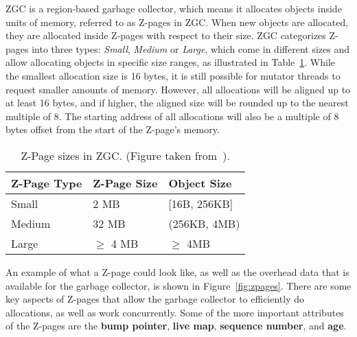 ZGC is a region-based garbage collector, which means it allocates objects inside units of memory, referred to as Z-pages in ZGC. When new objects are allocated, they are allocated inside Z-pages with respect to their size. ZGC categorizes Z-pages into three types: \textit{Small}, \textit{Medium} or \textit{Large}, which come in different sizes and allow allocating objects in specific size ranges, as illustrated in Table~\ref{table:zpage_sizes}. While the smallest allocation size is 16 bytes, it is still possible for mutator threads to request smaller amounts of memory. However, all allocations will be aligned up to at least 16 bytes, and if higher, the aligned size will be rounded up to the nearest multiple of 8. The starting address of all allocations will also be a multiple of 8 bytes offset from the start of the Z-page's memory.

\begin{table}[H]
    \centering
    \begin{tabular}{lllll}
        \hline
        Z-Page Type & Z-Page Size   & \multicolumn{3}{l}{Object Size}      \\ \hline
        Small       & 2 MB          & \multicolumn{3}{l}{{[}16B, 256KB{]}} \\
        Medium      & 32 MB         & \multicolumn{3}{l}{(256KB, 4MB)}     \\
        Large       & $\geq$ 4 MB   & \multicolumn{3}{l}{$\geq$ 4MB}       \\ \hline
    \end{tabular}
    \caption{Z-Page sizes in ZGC. (Figure taken from~\cite{zpage_size_table}). }
    \label{table:zpage_sizes}
\end{table}

An example of what a Z-page could look like, as well as the overhead data that is available for the garbage collector, is shown in Figure~\ref{fig:zpages}. There are some key aspects of Z-pages that allow the garbage collector to efficiently do allocations, as well as work concurrently. Some of the more important attributes of the Z-pages are the \textbf{bump pointer}, \textbf{live map}, \textbf{sequence number}, and \textbf{age}.

